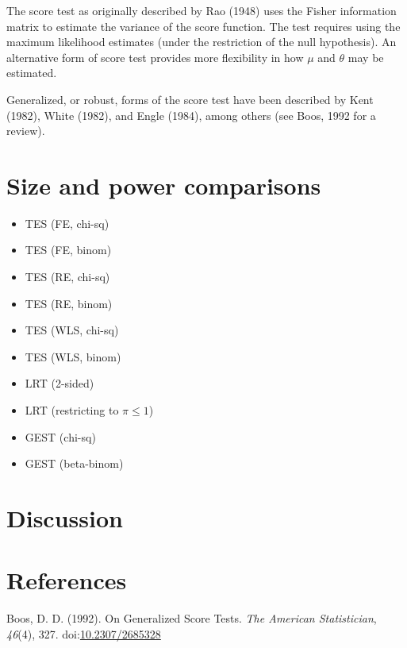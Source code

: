 \documentclass[man,floatsintext]{apa6}
\providecommand{\tightlist}{%
  \setlength{\itemsep}{0pt}\setlength{\parskip}{0pt}}
\begin{document}
The score test as originally described by Rao (1948) uses the Fisher information matrix to estimate the variance of the score function. The test requires using the maximum likelihood estimates (under the restriction of the null hypothesis). An alternative form of score test provides more flexibility in how \(\mu\) and \(\theta\) may be estimated.

Generalized, or robust, forms of the score test have been described by Kent (1982), White (1982), and Engle (1984), among others (see Boos, 1992 for a review).

\hypertarget{simulations}{%
\section{Size and power comparisons}\label{simulations}}

\begin{itemize}
\tightlist
\item
  TES (FE, chi-sq)
\item
  TES (FE, binom)
\item
  TES (RE, chi-sq)
\item
  TES (RE, binom)
\item
  TES (WLS, chi-sq)
\item
  TES (WLS, binom)
\item
  LRT (2-sided)
\item
  LRT (restricting to \(\pi \leq 1\))
\item
  GEST (chi-sq)
\item
  GEST (beta-binom)
\end{itemize}

\hypertarget{discussion}{%
\section{Discussion}\label{discussion}}

\newpage

\hypertarget{references}{%
\section{References}\label{references}}

\begingroup
\setlength{\parindent}{-0.5in}
\setlength{\leftskip}{0.5in}

\hypertarget{refs}{}
\leavevmode\hypertarget{ref-boos1992GeneralizedScoreTests}{}%
Boos, D. D. (1992). On Generalized Score Tests. \emph{The American Statistician}, \emph{46}(4), 327. doi:\href{https://doi.org/10.2307/2685328}{10.2307/2685328}
\end{document}
